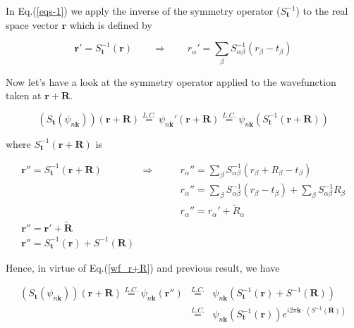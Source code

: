 \documentclass[a4paper,12pt]{report}
\begin{document}
In Eq.(\ref{eqs-1}) we apply the inverse of the symmetry operator ($S_{\mathbf{t}}^{-1}$) to the real space vector $\mathbf{r}$ which is defined by

\begin{equation}
\mathbf{r}' = S_{\mathbf{t}}^{-1}\left( \mathbf{r}\right)  \qquad \Rightarrow  \qquad r_{\alpha}' = \sum_{\beta} S_{\alpha \beta}^{-1}\left( r_{\beta} - t_{\beta}\right)
\end{equation}

Now let's have a look at the symmetry operator applied to the wavefunction taken at $\mathbf{r}+\mathbf{R}$.

\begin{equation}
\left( S_{\mathbf{t}} \left( \psi_{n\mathbf{k}}\right) \right) (\mathbf{r}+\mathbf{R}) \stackrel{L.C.}{=} \psi_{n\mathbf{k}}'(\mathbf{r}+\mathbf{R}) \stackrel{L.C.}{=} \psi_{n\mathbf{k}}(S_{\mathbf{t}}^{-1}\left( \mathbf{r}+\mathbf{R}\right) ) \label{eqA}
\end{equation}

where $S_{\mathbf{t}}^{-1}\left( \mathbf{r}+\mathbf{R}\right)$ is

\begin{eqnarray}
\mathbf{r}'' = S_{\mathbf{t}}^{-1}\left( \mathbf{r}+\mathbf{R}\right) \qquad &\Rightarrow&  \qquad r_{\alpha}'' = \sum_{\beta} S_{\alpha \beta}^{-1}\left( r_{\beta} + R_{\beta} - t_{\beta}\right) \nonumber \\
&& \qquad r_{\alpha}'' = \sum_{\beta} S_{\alpha \beta}^{-1}\left( r_{\beta} - t_{\beta}\right) + \sum_{\beta} S_{\alpha \beta}^{-1}R_{\beta} \nonumber \\
&& \qquad r_{\alpha}'' = r_{\alpha}' + \tilde{R}_{\alpha} \nonumber\\
\mathbf{r}'' = \mathbf{r}' + \tilde{\mathbf{R}} \qquad \qquad \quad&& \nonumber\\
\mathbf{r}'' =  S_{\mathbf{t}}^{-1}\left( \mathbf{r}\right) +  S^{-1}\left(\mathbf{R}\right)  &&
\end{eqnarray}

Hence, in virtue of Eq.(\ref{wf_r+R}) and previous result, we have

\begin{eqnarray}
\left( S_{\mathbf{t}} \left( \psi_{n\mathbf{k}}\right) \right) (\mathbf{r}+\mathbf{R}) \stackrel{L.C.}{=} \psi_{n\mathbf{k}}(\mathbf{r}'') &\stackrel{L.C.}{=}& \psi_{n\mathbf{k}}(S_{\mathbf{t}}^{-1}\left( \mathbf{r}\right) + S^{-1}\left(\mathbf{R}\right)) \nonumber \\
&\stackrel{L.C.}{=}& \psi_{n\mathbf{k}}(S_{\mathbf{t}}^{-1}\left( \mathbf{r}\right)) e^{i2\pi\mathbf{k}\cdotp\left(S^{-1}\left(\mathbf{R}\right)\right) }
\end{eqnarray}
\end{document}
